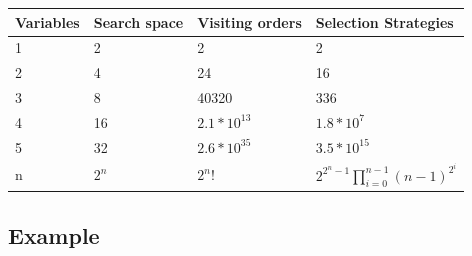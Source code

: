 \enableunderscores
\begin{center}
\begin{tabular}{|l|l|l|l|}
\hline
Variables&      Search space&   Visiting orders&        Selection Strategies\\
\hline
1&              2&                      2&              2\\
2&              4&                      24&             16\\
3&              8&                      40320&          336\\
4&              16&                     $2.1*10^{13}$&  $1.8*10^7$\\
5&              32&                     $2.6*10^{35}$&  $3.5*10^{15}$\\
n&              $2^n$&          $2^n!$& 
                                $2^{{2^n}-1} \prod_{i=0}^{n-1} (n-1)^{2^i}$\\
\hline
\end{tabular}
\end{center}
\disableunderscores

\subsection{Example}

